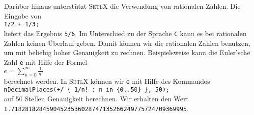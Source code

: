 Darüber hinaus unterstützt \textsc{SetlX} die Verwendung von rationalen Zahlen.  Die
Eingabe von
\\[0.2cm]
\hspace*{1.3cm}
\texttt{1/2 + 1/3;}
\\[0.2cm]
liefert das Ergebnis \texttt{5/6}.  Im Unterschied zu der Sprache \texttt{C} kann es bei rationalen
Zahlen keinen Überlauf geben.  Damit können wir die rationalen Zahlen benutzen, um mit beliebig
hoher Genauigkeit zu rechnen.  Beispielsweise kann die Euler'sche Zahl \texttt{e} mit Hilfe der Formel
\\[0.2cm]
\hspace*{1.3cm}
$\displaystyle e = \sum\limits_{n=0}^\infty \frac{1}{n!}$
\\[0.2cm]
berechnet werden.  In \textsc{SetlX} können wir \texttt{e} mit Hilfe des Kommandos
\\[0.2cm]
\hspace*{1.3cm}
\texttt{nDecimalPlaces(+/ \{ 1/n! : n in \{0..50\} \}, 50);}
\\[0.2cm]
auf 50 Stellen Genauigkeit berechnen.  Wir erhalten den Wert
\\[0.2cm]
\hspace*{1.3cm}
\texttt{1.71828182845904523536028747135266249775724709369995}.


